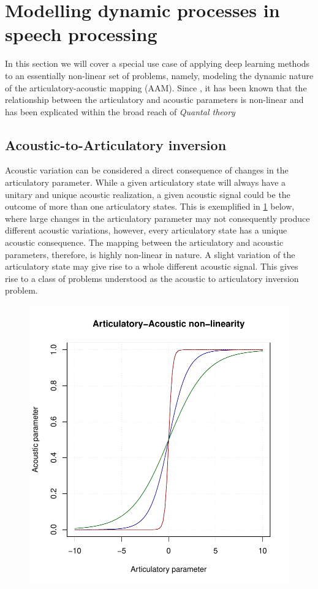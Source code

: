 \documentclass{article}[12pt]
\begin{document}
\section{Modelling dynamic processes in speech processing}
In this section we will cover a special use case of applying deep learning methods to an essentially non-linear set of problems, namely, modeling the dynamic nature of the articulatory-acoustic mapping (AAM). Since \cite{stevens1968}, it has been known that the relationship between the articulatory and acoustic parameters is non-linear and has been explicated within the broad reach of \emph{Quantal theory} \citep{stevens1968}

\subsection{Acoustic-to-Articulatory inversion}
Acoustic variation can be considered a direct consequence of changes in the articulatory parameter. While a given articulatory state will always have a unitary and unique acoustic realization, a given acoustic signal could be the outcome of more than one articulatory states. This is exemplified in \ref{Fig.1} below, where large changes in the articulatory parameter may not consequently produce different acoustic variations, however, every articulatory state has a unique acoustic consequence. The mapping between the articulatory and acoustic parameters, therefore, is highly non-linear in nature. A slight variation of the articulatory state may give rise to a whole different acoustic signal. This gives rise to a class of problems understood as the acoustic to articulatory inversion problem.

\begin{figure}[h]
\includegraphics[scale=0.80]{sigmoid.pdf}
\label{Fig.1}
\end{figure}
\end{document}
